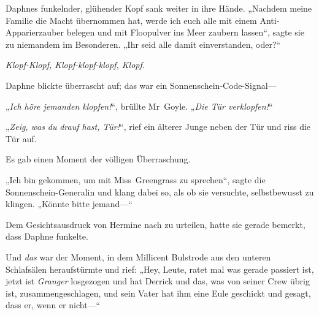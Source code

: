 Daphnes funkelnder, glühender Kopf sank weiter in ihre Hände. „Nachdem meine Familie die Macht übernommen hat, werde ich euch alle mit einem Anti-Apparierzauber belegen und mit Floopulver ins Meer zaubern lassen“, sagte sie zu niemandem im Besonderen. „Ihr seid alle damit einverstanden, oder?“

\emph{Klopf-Klopf, Klopf-klopf-klopf, Klopf.}

Daphne blickte überrascht auf; das war ein Sonnenschein-Code-Signal—

„\emph{Ich höre jemanden klopfen!}“, brüllte Mr~Goyle. „\emph{Die Tür verklopfen!}“

„\emph{Zeig, was du} \emph{drauf hast, Tür!}“, rief ein älterer Junge neben der Tür und riss die Tür auf.

Es gab einen Moment der völligen Überraschung.

„Ich bin gekommen, um mit Miss~Greengrass zu sprechen“, sagte die Sonnenschein-Generalin und klang dabei so, als ob sie versuchte, selbstbewusst zu klingen. „Könnte bitte jemand—“

Dem Gesichtsausdruck von Hermine nach zu urteilen, hatte sie gerade bemerkt, dass Daphne funkelte.

Und \emph{das} war der Moment, in dem Millicent Bulstrode aus den unteren Schlafsälen heraufstürmte und rief: „Hey, Leute, ratet mal was gerade passiert ist, jetzt ist \emph{Granger} losgezogen und hat Derrick und das, was von seiner Crew übrig ist, zusammengeschlagen, und sein Vater hat ihm eine Eule geschickt und gesagt, dass er, wenn er nicht—“

